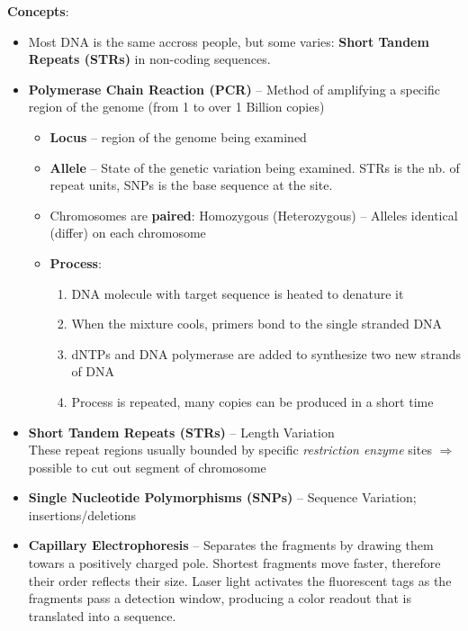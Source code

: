 \documentclass[a4paper]{article}
\begin{document}
      \textbf{Concepts}:
      \begin{itemize}
        \item Most DNA is the same accross people, but some varies: \textbf{Short Tandem Repeats (STRs)} in non-coding sequences.
        \item \textbf{Polymerase Chain Reaction (PCR)} -- Method of amplifying a specific region of the genome (from 1 to over 1 Billion copies)
        \begin{itemize}
          \item \textbf{Locus} -- region of the genome being examined 
          \item \textbf{Allele} -- State of the genetic variation being examined. STRs is the nb. of repeat units, SNPs is the base sequence at the site.
          \item Chromosomes are \textbf{paired}: Homozygous (Heterozygous) -- Alleles identical (differ) on each chromosome
          \item \textbf{Process}:
          \begin{enumerate}
            \item DNA molecule with target sequence is heated to denature it
            \item When the mixture cools, primers bond to the single stranded DNA
            \item dNTPs and DNA polymerase are added to synthesize two new strands of DNA
            \item Process is repeated, many copies can be produced in a short time
          \end{enumerate}
        \end{itemize}
        \item \textbf{Short Tandem Repeats (STRs)} -- Length Variation\\
        These repeat regions usually bounded by specific \emph{restriction enzyme} sites $\Rightarrow$ possible to cut out segment of chromosome
        \item \textbf{Single Nucleotide Polymorphisms (SNPs)} -- Sequence Variation; insertions/deletions
        \item \textbf{Capillary Electrophoresis} -- Separates the fragments by drawing them towars a positively charged pole. Shortest fragments move faster, therefore their order reflects their size. Laser light activates the fluorescent tags as the fragments pass a detection window, producing a color readout that is translated into a sequence.
      \end{itemize}
\end{document}

